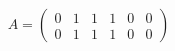 \documentclass{amsart}
\begin{document}
    \begin{center} %
    \begin{align*}
        A = \begin{pmatrix}
            0  &  1  &  1  &  1  &  0  &  0 \\
            0  &  1  &  1  &  1  &  0  &  0
        \end{pmatrix}
    \end{align*}
\end{center}
\end{document}
